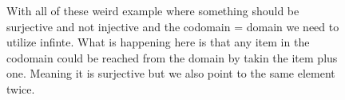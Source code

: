 \documentclass[a5paper]{article}
\begin{document}
\begin{figure}[ht]
	\centering
	\caption*{With all of these weird example where something should be surjective and not injective and the codomain = domain we need to utilize infinte. What is happening here is that any item in the codomain could be reached from the domain by takin the item plus one. Meaning it is surjective but we also point to the same element twice. 
	}\label{fig:2017_1-3-4-1}
\end{figure}
\end{document}
